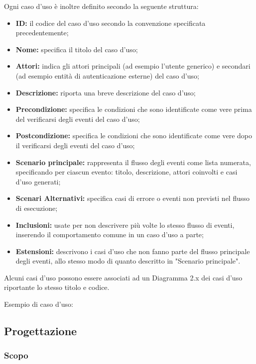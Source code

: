 \documentclass[../NomeDocumento.tex]{subfiles}
\begin{document}
	\noindent Ogni caso d'uso è inoltre definito secondo la seguente struttura:
	\begin{itemize}
		\item \textbf{ID:} il codice del caso d'uso secondo la convenzione specificata precedentemente;
		\item \textbf{Nome:} specifica il titolo del caso d'uso;
		\item \textbf{Attori:} indica gli attori principali (ad esempio l'utente generico) e secondari (ad esempio entità di autenticazione esterne) del caso d'uso;
		\item \textbf{Descrizione:} riporta una breve descrizione del caso d'uso;
		\item \textbf{Precondizione:} specifica le condizioni che sono identificate come vere prima del verificarsi degli eventi del caso d'uso;
		\item \textbf{Postcondizione:} specifica le condizioni che sono identificate come vere dopo il verificarsi degli eventi del caso d'uso;
		\item \textbf{Scenario principale:} rappresenta il flusso degli eventi come lista numerata, specificando per ciascun evento: titolo, descrizione, attori coinvolti e casi d'uso generati;
		\item \textbf{Scenari Alternativi:} specifica casi di errore o eventi non previsti nel flusso di esecuzione;
		\item \textbf{Inclusioni:} usate per non descrivere più volte lo stesso flusso di eventi, inserendo il comportamento comune in un caso d'uso a parte;
		\item \textbf{Estensioni:} descrivono i casi d'uso che non fanno parte del flusso principale degli eventi, allo stesso modo di quanto descritto in "Scenario principale".
	\end{itemize}

	Alcuni casi d'uso possono essere associati ad un Diagramma  2.x dei casi d'uso riportante lo stesso titolo e codice.

	
	\centerline{Esempio di caso d'uso:}	%
	
	
\subsection{Progettazione} 

	\subsubsection{Scopo} 
\end{document}
